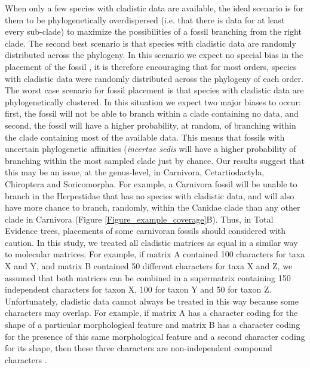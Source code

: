 When only a few species with cladistic data are available, the ideal scenario is for them to be phylogenetically overdispersed (i.e. that there is data for at least every sub-clade) to maximize the possibilities of a fossil branching from the right clade.
The second best scenario is that species with cladistic data are randomly distributed across the phylogeny. 
In this scenario we expect no special bias in the placement of the fossil \citep{GuillermeCooper}, it is therefore encouraging that for most orders, species with cladistic data were randomly distributed across the phylogeny of each order.
The worst case scenario for fossil placement is that species with cladistic data are phylogenetically clustered. 
In this situation we expect two major biases to occur: first, the fossil will not be able to branch within a clade containing no data, and second, the fossil will have a higher probability, at random, of branching within the clade containing most of the available data.
This means that fossils with uncertain phylogenetic affinities (\textit{incertae sedis} will have a higher probability of branching within the most sampled clade just by chance.
Our results suggest that this may be an issue, at the genus-level, in Carnivora, Cetartiodactyla, Chiroptera and Soricomorpha. 
For example, a Carnivora fossil will be unable to branch in the Herpestidae that has no species with cladistic data, and will also have more chance to branch, randomly, within the Canidae clade than any other clade in Carnivora (Figure \ref{Figure_example_coverage}B).
Thus, in Total Evidence trees, placements of some carnivoran fossils should considered with caution. 
In this study, we treated all cladistic matrices as equal in a similar way to molecular matrices. 
For example, if matrix A contained 100 characters for taxa X and Y, and matrix B contained 50 different characters for taxa X and Z, we assumed that both matrices can be combined in a supermatrix containing 150 independent characters for taxon X, 100 for taxon Y and 50 for taxon Z.
Unfortunately, cladistic data cannot always be treated in this way because some characters may overlap.
For example, if matrix A has a character coding for the shape of a particular morphological feature and matrix B has a character coding for the presence of this same morphological feature and a second character coding for its shape, then these three characters are non-independent compound characters \citep{Brazeau2011}.
